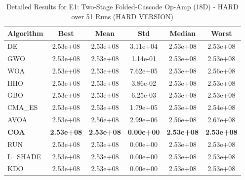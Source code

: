 \begin{table}[htbp]
\centering
\caption{Detailed Results for E1: Two-Stage Folded-Cascode Op-Amp (18D) - HARD over 51 Runs (HARD VERSION)}
\label{tab:P1_detailed}
\small
\begin{tabular}{lccccc}
\toprule
\textbf{Algorithm} & \textbf{Best} & \textbf{Mean} & \textbf{Std} & \textbf{Median} & \textbf{Worst} \\
\midrule
DE & 2.53e+08 & 2.53e+08 & 3.11e+04 & 2.53e+08 & 2.53e+08 \\
GWO & 2.53e+08 & 2.53e+08 & 1.14e-01 & 2.53e+08 & 2.53e+08 \\
WOA & 2.53e+08 & 2.53e+08 & 7.62e+05 & 2.53e+08 & 2.56e+08 \\
HHO & 2.53e+08 & 2.53e+08 & 3.86e-02 & 2.53e+08 & 2.53e+08 \\
GBO & 2.53e+08 & 2.53e+08 & 6.25e-03 & 2.53e+08 & 2.53e+08 \\
CMA_ES & 2.53e+08 & 2.53e+08 & 1.79e+05 & 2.53e+08 & 2.54e+08 \\
AVOA & 2.53e+08 & 2.56e+08 & 2.99e+06 & 2.56e+08 & 2.67e+08 \\
\textbf{COA} & \textbf{2.53e+08} & \textbf{2.53e+08} & \textbf{0.00e+00} & \textbf{2.53e+08} & \textbf{2.53e+08} \\
RUN & 2.53e+08 & 2.53e+08 & 0.00e+00 & 2.53e+08 & 2.53e+08 \\
L_SHADE & 2.53e+08 & 2.53e+08 & 0.00e+00 & 2.53e+08 & 2.53e+08 \\
KDO & 2.53e+08 & 2.53e+08 & 0.00e+00 & 2.53e+08 & 2.53e+08 \\
\bottomrule
\end{tabular}
\end{table}
